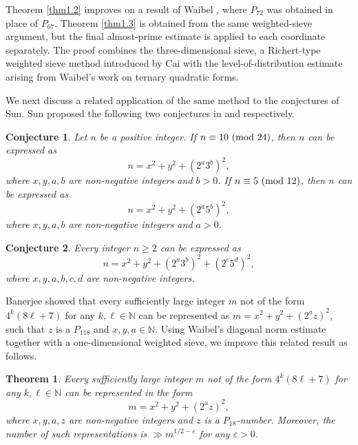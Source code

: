 \documentclass[12pt,a4paper,reqno]{amsart}
\numberwithin{equation}{section}
\def\pmod #1{\ ({\rm{mod}}\ #1)}
\theoremstyle{plain}
\newtheorem{theorem}{Theorem}
\newtheorem{conjecture}{Conjecture}
\theoremstyle{definition}
\begin{document}
Theorem \ref{thm1.2} improves on a result of Waibel \cite{Wa}, where $P_{72}$ was obtained in place of $P_{67}$. Theorem \ref{thm1.3} is obtained from the same weighted-sieve argument, but the final almost-prime estimate is applied to each coordinate separately. The proof combines the three-dimensional sieve, a Richert-type weighted sieve method introduced by Cai \cite{Cai} with the level-of-distribution estimate arising from Waibel's work on ternary quadratic forms.

We next discuss a related application of the same method to the conjectures of Sun. Sun proposed the following two conjectures in \cite{Sun0} and \cite{Sun2} respectively.

\begin{conjecture}
Let $n$ be a positive integer. If $ n\equiv10\pmod{24} $, then $n$ can be expressed as
\[
n = x^{2} + y^{2} + (2^{a}3^{b})^{2},
\]
where $x,y,a,b$ are non-negative integers and $b>0$. If $ n\equiv5\pmod{12} $, then $n$ can be expressed as
\[
n = x^{2} + y^{2} + (2^{a}5^{b})^{2},
\]
where $x,y,a,b$ are non-negative integers and $a>0$.
\end{conjecture}


\begin{conjecture}
Every integer $n \geq 2$ can be expressed as
\[
n = x^{2} + y^{2} + (2^{a}3^{b})^{2} + (2^{c}5^{d})^{2},
\]
where \(x,y,a,b,c,d\) are non-negative integers. 
\end{conjecture}


Banerjee \cite{Ban} showed that every sufficiently large integer $m$ not of the form $4^k(8\ell + 7)$ for any $k,\ell\in\mathbb{N}$ can be represented as $ m = x^2 + y^2 + (2^a z)^2,$ such that $z$ is a $P_{118}$ and $x,y,a\in\mathbb{N}$. Using Waibel's diagonal norm estimate \cite[Theorem 2]{Wa} together with a one-dimensional weighted sieve, we improve this related result as follows.

\begin{theorem}\label{thm1.1}
Every sufficiently large integer $m$ not of the form $4^k(8\ell + 7)$ for any $k,\ell\in\mathbb{N}$ can be represented in the form
\[
m = x^2 + y^2 + (2^a z)^2,
\]
where $x,y,a,z$ are non-negative integers and $z$ is a $P_{18}$-number. Moreover, the number of such representations is $\gg m^{1/2-\varepsilon}$ for any $\varepsilon>0$.
\end{theorem}
\end{document}
